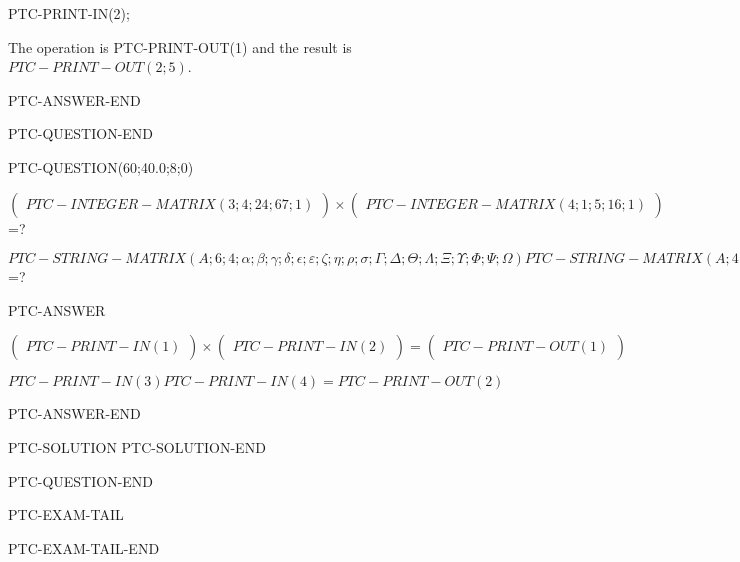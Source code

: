 \documentclass[12pt]{article}
\begin{document}
PTC-PRINT-IN(2);

The operation is PTC-PRINT-OUT(1) and the result is
$PTC-PRINT-OUT(2;5)$.

PTC-ANSWER-END

\vspace{0.3in}
PTC-QUESTION-END







PTC-QUESTION(60;40.0;8;0)

$ \left( \begin{array}{ccccccccc}
 PTC-INTEGER-MATRIX(3;4;24;67;1)
 \end{array}\right) \times
\left( \begin{array}{c}
 PTC-INTEGER-MATRIX(4;1;5;16;1)
 \end{array}\right) $ =?


$ PTC-STRING-MATRIX(A;6;4; \alpha ; \beta ; \gamma ; \delta ; \epsilon ; \varepsilon ;
                   \zeta ; \eta ; \rho ; \sigma ; \Gamma ; \Delta ; \Theta ; \Lambda ;
                   \Xi ; \Upsilon ; \Phi ; \Psi ; \Omega )
 PTC-STRING-MATRIX(A;4;1; \alpha ; \beta ; \gamma ; \delta ; \epsilon ; \varepsilon ;
                   \zeta ; \eta ; \rho ; \sigma) $ =?

PTC-ANSWER

$\left( \begin{array}{ccccccccccccccc}
 PTC-PRINT-IN(1)
 \end{array}\right) \times
\left( \begin{array}{c}
 PTC-PRINT-IN(2)
 \end{array}\right)  =
 \left( \begin{array}{c}
 PTC-PRINT-OUT(1)
 \end{array}\right)  $

$ PTC-PRINT-IN(3)
 PTC-PRINT-IN(4)=
 PTC-PRINT-OUT(2)  $

PTC-ANSWER-END

PTC-SOLUTION
PTC-SOLUTION-END

\vspace{0.3in}
PTC-QUESTION-END





PTC-EXAM-TAIL

PTC-EXAM-TAIL-END
\end{document}
